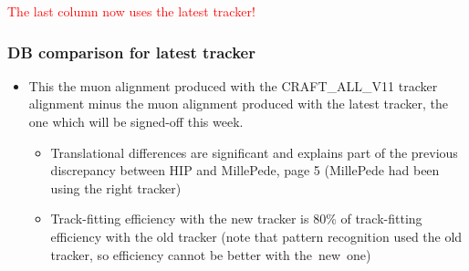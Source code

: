 \documentclass[compress]{beamer}
\begin{document}
\begin{frame}
\vfill \tiny \textcolor{red}{The last column now uses the latest tracker!}
\end{frame}

\begin{frame}
\frametitle{DB comparison for latest tracker}

\begin{itemize}\scriptsize
\item This the muon alignment produced with the CRAFT\_ALL\_V11
  tracker alignment minus the muon alignment produced with the latest
  tracker, the one which will be signed-off this week.
\begin{itemize}\tiny
\item Translational differences are significant and explains part of
  the previous discrepancy between HIP and MillePede, page 5
  (MillePede had been using the right tracker)
\item Track-fitting efficiency with the new tracker is 80\% of
  track-fitting efficiency with the old tracker (note that pattern
  recognition used the old tracker, so efficiency cannot be better
  with \mbox{the new one)\hspace{-1 cm}}
\end{itemize}
\end{itemize}


\end{frame}
\end{document}
